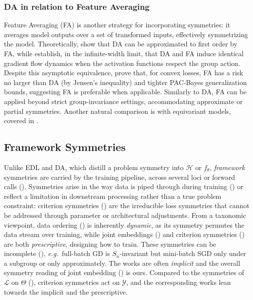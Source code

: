 \documentclass[mathematics,review,submit,moreauthors]{Definitions/mdpi}
\begin{document}
\subsubsection{DA in relation to Feature Averaging}\label{sec:da-fa}
Feature Averaging (FA) is another strategy for incorporating symmetries: it averages model outputs over a set of transformed inputs, effectively symmetrizing the model.
Theoretically, \citet{dao2019p3icml} show that DA can be approximated to first order by FA, while \citet{maass2024} establish, in the infinite-width limit, that DA and FA induce identical gradient flow dynamics when the activation functions respect the group action.
Despite this asymptotic equivalence, \citet{lyle2020} prove that, for convex losses, FA has a risk no larger than DA (by Jensen's inequality) and tighter PAC-Bayes generalization bounds, suggesting FA is preferable when applicable.
Similarly to DA, FA can be applied beyond strict group-invariance settings, accommodating approximate or partial symmetries.
Another natural comparison is with equivariant models, covered in .

\subsection{Framework Symmetries}\label{sec:framework-symmetries}
Unlike EDL and DA, which distill a problem symmetry into $\mathcal{H}$ or $f_\theta$, \emph{framework} symmetries are carried by the training pipeline, across several loci or forward calls ().
Symmetries arise in the way data is piped through during training () or reflect a limitation in downstream processing rather than a true problem constraint: criterion symmetries () are the irreducible loss symmetries that cannot be addressed through parameter or architectural adjustments.
From a taxonomic viewpoint, data ordering () is inherently \emph{dynamic}, as its symmetry permutes the data stream over training, while joint embeddings () and criterion symmetries () are both \emph{prescriptive}, designing how to train.
These symmetries can be incomplete (), \textit{e.g.}\ full-batch GD is $S_n$-invariant but mini-batch SGD only under a subgroup or only approximately. The works are often \emph{implicit} and the overall symmetry reading of joint embedding () is ours.
Compared to the symmetries of $\mathcal{L}$ on $\Theta$ (), criterion symmetries act on $\mathcal{Y}$, and the corresponding works lean towards the implicit and the prescriptive.
\end{document}
